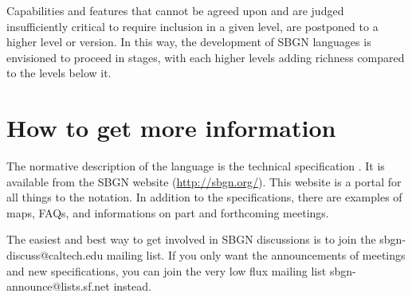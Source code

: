 Capabilities and features that cannot be agreed upon and are judged insufficiently critical to require inclusion in a given level, are postponed to a higher level or version.  In this way, the development of SBGN languages is envisioned to proceed in stages, with each higher levels adding richness compared to the levels below it.

\section{How to get more information}
\label{sec:info}

The normative description of the language is the technical specification \cite{Moodie2011}. It is available from the SBGN website (\url{http://sbgn.org/}). This website is a portal for all things to the notation. In addition to the specifications, there are examples of maps, FAQs, and informations on part and forthcoming meetings.  

The easiest and best way to get involved in SBGN  discussions is to join the sbgn-discuss@caltech.edu mailing list. If you only want the announcements of meetings and new specifications, you can join the very low flux mailing list sbgn-announce@lists.sf.net instead.
